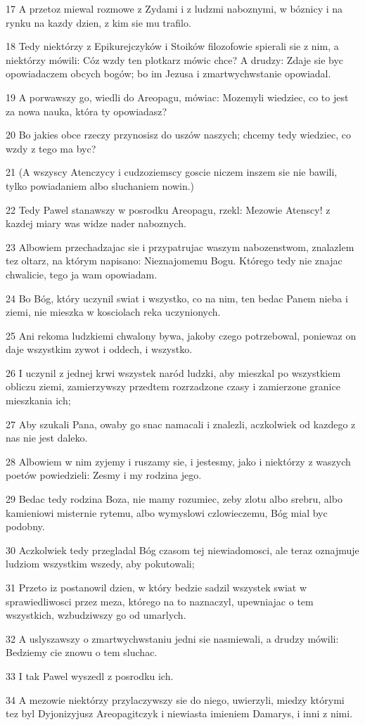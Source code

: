 \par 17 A przetoz miewal rozmowe z Zydami i z ludzmi naboznymi, w bóznicy i na rynku na kazdy dzien, z kim sie mu trafilo.
\par 18 Tedy niektórzy z Epikurejczyków i Stoików filozofowie spierali sie z nim, a niektórzy mówili: Cóz wzdy ten plotkarz mówic chce? A drudzy: Zdaje sie byc opowiadaczem obcych bogów; bo im Jezusa i zmartwychwstanie opowiadal.
\par 19 A porwawszy go, wiedli do Areopagu, mówiac: Mozemyli wiedziec, co to jest za nowa nauka, która ty opowiadasz?
\par 20 Bo jakies obce rzeczy przynosisz do uszów naszych; chcemy tedy wiedziec, co wzdy z tego ma byc?
\par 21 (A wszyscy Atenczycy i cudzoziemscy goscie niczem inszem sie nie bawili, tylko powiadaniem albo sluchaniem nowin.)
\par 22 Tedy Pawel stanawszy w posrodku Areopagu, rzekl: Mezowie Atenscy! z kazdej miary was widze nader naboznych.
\par 23 Albowiem przechadzajac sie i przypatrujac waszym nabozenstwom, znalazlem tez oltarz, na którym napisano: Nieznajomemu Bogu. Którego tedy nie znajac chwalicie, tego ja wam opowiadam.
\par 24 Bo Bóg, który uczynil swiat i wszystko, co na nim, ten bedac Panem nieba i ziemi, nie mieszka w kosciolach reka uczynionych.
\par 25 Ani rekoma ludzkiemi chwalony bywa, jakoby czego potrzebowal, poniewaz on daje wszystkim zywot i oddech, i wszystko.
\par 26 I uczynil z jednej krwi wszystek naród ludzki, aby mieszkal po wszystkiem obliczu ziemi, zamierzywszy przedtem rozrzadzone czasy i zamierzone granice mieszkania ich;
\par 27 Aby szukali Pana, owaby go snac namacali i znalezli, aczkolwiek od kazdego z nas nie jest daleko.
\par 28 Albowiem w nim zyjemy i ruszamy sie, i jestesmy, jako i niektórzy z waszych poetów powiedzieli: Zesmy i my rodzina jego.
\par 29 Bedac tedy rodzina Boza, nie mamy rozumiec, zeby zlotu albo srebru, albo kamieniowi misternie rytemu, albo wymyslowi czlowieczemu, Bóg mial byc podobny.
\par 30 Aczkolwiek tedy przegladal Bóg czasom tej niewiadomosci, ale teraz oznajmuje ludziom wszystkim wszedy, aby pokutowali;
\par 31 Przeto iz postanowil dzien, w który bedzie sadzil wszystek swiat w sprawiedliwosci przez meza, którego na to naznaczyl, upewniajac o tem wszystkich, wzbudziwszy go od umarlych.
\par 32 A uslyszawszy o zmartwychwstaniu jedni sie nasmiewali, a drudzy mówili: Bedziemy cie znowu o tem sluchac.
\par 33 I tak Pawel wyszedl z posrodku ich.
\par 34 A mezowie niektórzy przylaczywszy sie do niego, uwierzyli, miedzy którymi tez byl Dyjonizyjusz Areopagitczyk i niewiasta imieniem Damarys, i inni z nimi.

